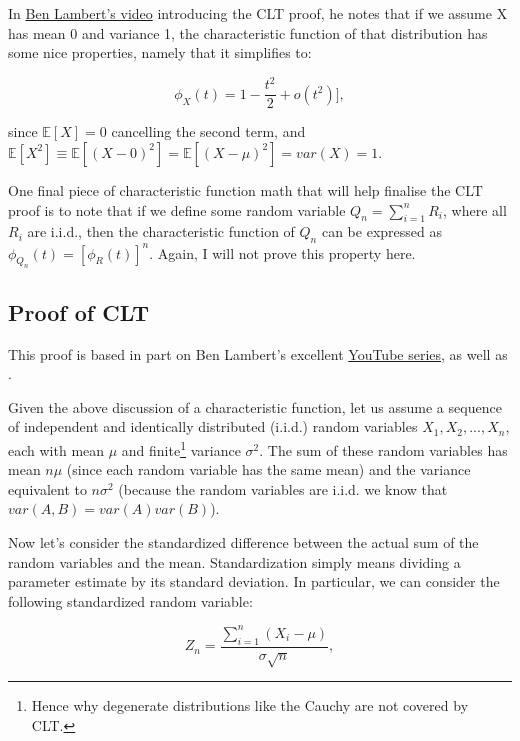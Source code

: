 \documentclass[
]{book}
\begin{document}
In \href{https://www.youtube.com/watch?v=0oHjbr2_AhQ}{Ben Lambert's video} introducing the CLT proof, he notes that if we assume X has mean 0 and variance 1, the characteristic function of that distribution has some nice properties, namely that it simplifies to:

\begin{equation}
\phi_X(t) = 1 - \frac{t^2}{2} + o(t^2)],
\end{equation}

since \(\mathbb{E}[X] = 0\) cancelling the second term, and \(\mathbb{E}[X^2] \equiv \mathbb{E}[(X-0)^2] = \mathbb{E}[(X-\mu)^2] = var(X) = 1\).

One final piece of characteristic function math that will help finalise the CLT proof is to note that if we define some random variable \(Q_n = \sum_{i=1}^{n}R_i\), where all \(R_i\) are i.i.d., then the characteristic function of \(Q_n\) can be expressed as \(\phi_{Q_n} (t) = [\phi_{R}(t)]^n\). Again, I will not prove this property here.

\hypertarget{proof-of-clt}{%
\subsection{Proof of CLT}\label{proof-of-clt}}

This proof is based in part on Ben Lambert's excellent \href{https://www.youtube.com/channel/UC3tFZR3eL1bDY8CqZDOQh-w}{YouTube series}, as well as \citet{Lemons_Langevin_Gythiel_2002}.

Given the above discussion of a characteristic function, let us assume a sequence of independent and identically distributed (i.i.d.) random variables \({X_1, X_2, ..., X_n}\), each with mean \(\mu\) and finite\footnote{Hence why degenerate distributions like the Cauchy are not covered by CLT.} variance \(\sigma^2\). The sum of these random variables has mean \(n\mu\) (since each random variable has the same mean) and the variance equivalent to \(n\sigma^2\) (because the random variables are i.i.d. we know that \(var(A,B) = var(A)var(B)\)).

Now let's consider the standardized difference between the actual sum of the random variables and the mean. Standardization simply means dividing a parameter estimate by its standard deviation. In particular, we can consider the following standardized random variable:

\begin{equation}
Z_n = \frac{\sum_{i=1}^{n}(X_i - \mu)}{\sigma\sqrt{n}},
\end{equation}
\end{document}
